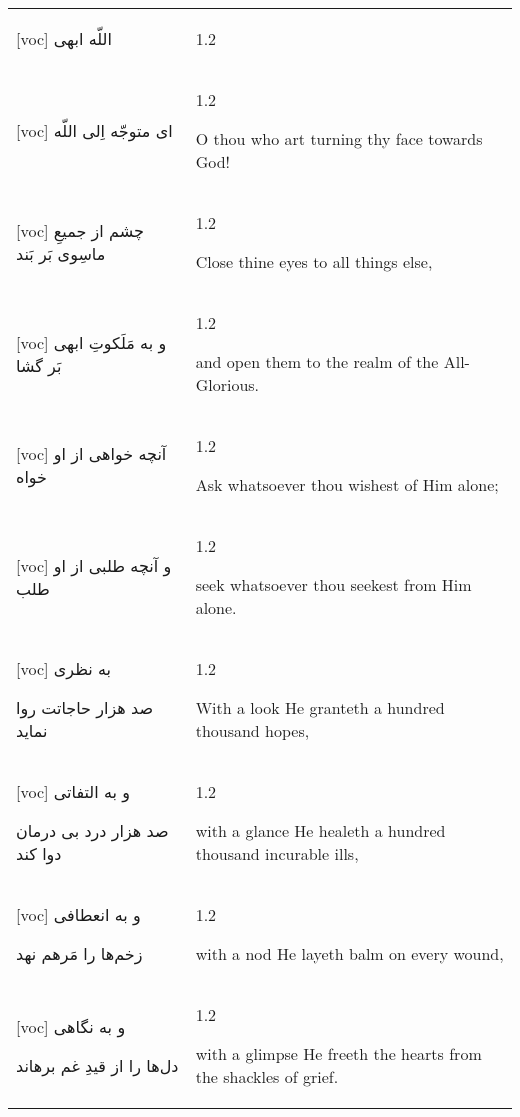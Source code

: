 \documentclass[11pt]{article}
\makeatletter
\newenvironment{orig}
  {\begin{farsi}[voc]}
  {\end{farsi}}
\newenvironment{trans}
  {\Large\begin{spacing}{1.2}\raggedright}
  {\end{spacing}}
\newenvironment{word}
  {\begin{longtable}[t]{p{3.5in}@{\hspace{3em}}p{2in}}}
  {\end{longtable}}
\newcommand{\ayat}[2]{\begin{orig}#1\end{orig} & \begin{trans}#2\end{trans}}
\newcommand{\define}[3]{\textfarsi[voc]{\Huge
    \textbf{#1}}\hspace{3mm}{\headwordfont \large
    \textit{#2}}\hspace{3mm}{\Large #3} \\[3ex]}
\newcommand{\fulldefine}[3]{\textfarsi[voc]{\Huge
    \textbf{#1}}\hspace{3mm}{\headwordfont \large
    \textit{#2}}\vspace{-1ex}\begin{quote}\Large #3\end{quote}\vspace{1ex}}
\makeatother
\begin{document}


\newpage

\begin{word}
\ayat{
اللّه ابهی
}{} \vspace{-1ex}\\ \ayat{
ای متوجّه اِلی اللّه
}{O thou who art turning thy face towards God!} \vspace{-1ex}\\ \ayat{
چشم از جميعِ ماسِوی بَر بَند
}{Close thine eyes to all things else,} \vspace{-1ex}\\ \ayat{
و به مَلَکوتِ ابهی بَر گشا
}{and open them to the realm of the All-Glorious.} \vspace{-1ex}\\ \ayat{
آنچه خواهی از او خواه
}{Ask whatsoever thou wishest of Him alone;} \vspace{-1ex}\\ \ayat{
و آنچه طلبی از او طلب
}{seek whatsoever thou seekest from Him alone.} \vspace{-1ex}\\ \ayat{
به نظری

صد هزار حاجاتت روا نمايد
}{With a look He granteth a hundred thousand hopes,} \vspace{-1ex}\\ \ayat{
و به التفاتی

صد هزار درد بی درمان دوا کند
}{with a glance He healeth a hundred thousand incurable ills,} \vspace{-1ex}\\ \ayat{
و به انعطافی

زخم‌ها را مَرهم نهد
}{with a nod He layeth balm on every wound,} \vspace{-1ex}\\ \ayat{
و به نگاهی

دل‌ها را از قيدِ غم برهاند
}{with a glimpse He freeth the hearts from the shackles of grief.}
\end{word}

\newpage
\end{document}
